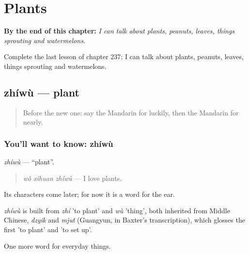 
\chapter{Plants}
\label{ch:zh-plants}

\begin{chapteropening}
\textbf{By the end of this chapter:} \emph{I can talk about plants, peanuts, leaves, things sprouting and watermelons.}

Complete the last lesson of chapter 237: I can talk about plants, peanuts, leaves, things sprouting and watermelons.
\end{chapteropening}

\section[zhíwù]{zhíwù — plant}

\label{lesson:ZH-C237-zhiwu}



\begin{quote}
Before the new one: say the Mandarin for luckily, then the Mandarin for nearly.
\end{quote}

\subsection*{You'll want to know: zhíwù}
\emph{zhíwù} — \textquotedblleft{}plant\textquotedblright{}.

\begin{quote}
\emph{wǒ xǐhuan zhíwù} — I love plants.
\end{quote}

Its characters come later; for now it is a word for the ear.

\begin{cousinweb}
\emph{zhíwù} is built from \emph{zhí} 'to plant' and \emph{wù} 'thing', both inherited from Middle Chinese, \emph{dzyik} and \emph{mjut} (Guangyun, in Baxter's transcription), which glosses the first 'to plant' and 'to set up'.
\end{cousinweb}

\begin{grammarlens}[title={What you've built}]
One more word for everyday things.
\end{grammarlens}

